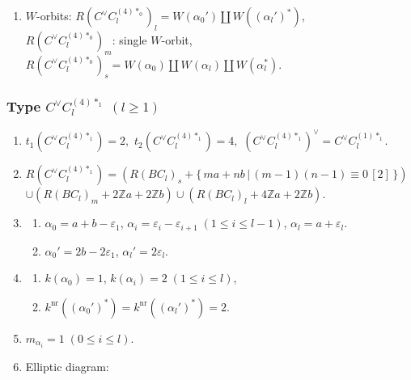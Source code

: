 \documentclass[11pt]{amsart}
\newcommand{\Z}{\mathbb{Z}}
\newcommand{\nr}{\mathrm{nr}}
\newcommand{\vep}{\varepsilon}
\begin{document}
{\begin{enumerate}
\begin{center}
{}
\end{center}
\item $W$-orbits: $R(C^\vee C_l^{(4)\ast_0})_l=W(\alpha_0') \amalg W((\alpha_l')^\ast)$, \\
\phantom{$W$-orbits:}  $R(C^\vee C_l^{(4)\ast_0})_m$: single $W$-orbit, \\
\phantom{$W$-orbits:} $R(C^\vee C_l^{(4)\ast_0})_s=W(\alpha_0) \amalg W(\alpha_l) \amalg W(\alpha_l^\ast)$.
\end{enumerate}



\subsubsection{Type $C^\vee C_l^{(4)\ast_1}$ $(l\geq 1)$}\label{data:CC-14}
\begin{enumerate}
\item $t_1(C^\vee C_l^{(4)\ast_1})=2,$ \quad $t_2(C^\vee C_l^{(4)\ast_1})=4,$ \quad $(C^\vee C_l^{(4)\ast_1})^\vee = C^\vee C_l^{(1)\ast_1}.$
\item $R(C^\vee C_l^{(4)\ast_{1}})=(R(BC_l)_s+\{ \,ma+nb\, \vert\, (m-1)(n-1) \equiv 0\, [2]\,\})$ \\
 $ \cup (R(BC_l)_m+2\Z a+2\Z b) \cup (R(BC_l)_l+4\Z a+2\Z b)$. 
\item 
\begin{enumerate}
\item[i)] $\alpha_0= a+b-\vep_1$, $\alpha_i=\vep_i-\vep_{i+1}\; 
(1\leq i \leq l-1)$, $\alpha_l=a+\vep_l$. 
\item[ii)] $\alpha_0'=2b-2\vep_1$, \; $\alpha_l'=2\vep_l$.
\end{enumerate}
\item 
\begin{enumerate}
\item[i)]  $k(\alpha_0)=1$, \; $k(\alpha_i)=2\; (1\leq i \leq l)$, 
\item[ii)] $k^{\nr}((\alpha_0')^\ast)=k^{\nr}((\alpha_l')^\ast)=2$. 
\end{enumerate}
\item $m_{\alpha_i}=1\; (0 \leq i \leq l)$. 
\item Elliptic diagram: 





\end{enumerate}}
\end{document}

